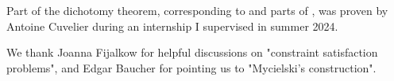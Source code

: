 \begin{chapterpresentation}
\begin{acknowledgements}
		Part of the dichotomy theorem, corresponding to  and parts of , was proven by Antoine Cuvelier during an internship I supervised in summer 2024.
		
		We thank Joanna Fijalkow for helpful discussions on "constraint satisfaction problems",
		and Edgar Baucher for pointing us to "Mycielski's construction".
	\end{acknowledgements}
	\clearpagepresentation
	\chaptertocstandalone
\end{chapterpresentation}











